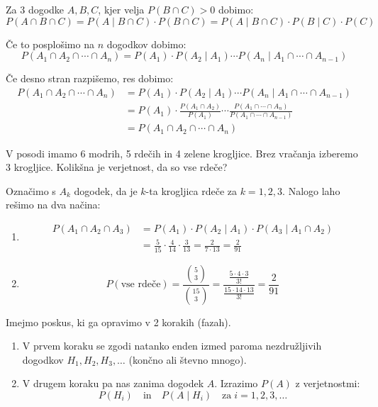 \documentclass[12pt]{book}
\def\n{\noindent}
\theoremstyle{definition}
\theoremstyle{plain}
\theoremstyle{plain}
\theoremstyle{plain}
\theoremstyle{remark}
\begin{document}
\n Za 3 dogodke $A, B, C$, kjer velja $P(B \cap C)>0$ dobimo:
$$
P(A \cap B \cap C)=P(A \mid B \cap C) \cdot P(B \cap C)=P(A \mid B \cap C) \cdot P(B \mid C) \cdot P(C)
$$

\n Če to posplošimo na $n$ dogodkov dobimo: 
$$
P\left(A_1 \cap A_2 \cap \cdots \cap A_n\right) =P\left(A_1\right) \cdot P\left(A_2 \mid A_1\right) \cdots P\left(A_n \mid A_1 \cap \cdots \cap A_{n-1}\right) 
$$

Če desno stran razpišemo, res dobimo: 
$$
\begin{aligned}
    P\left(A_1 \cap A_2 \cap \cdots \cap A_n\right) &=P\left(A_1\right) \cdot P\left(A_2 \mid A_1\right) \cdots P\left(A_n \mid A_1 \cap \cdots \cap A_{n-1}\right) \\
    &=P\left(A_1\right) \cdot \frac{P\left(A_1 \cap A_2\right)}{P\left(A_1\right)} \cdots \frac{P\left(A_1 \cap \cdots \cap A_n\right)}{P\left(A_1 \cap \cdots \cap A_{n-1}\right)} \\
    &=P\left(A_1 \cap A_2 \cap \cdots \cap A_n\right)
\end{aligned}
$$

\begin{zgled}
    V posodi imamo 6 modrih, 5 rdečih in 4 zelene krogljice. Brez vračanja izberemo 3 krogljice. Kolikšna je verjetnost, da so vse rdeče?

    Označimo s $A_k$ dogodek, da je $k$-ta krogljica rdeče za $k=1, 2, 3$. Nalogo laho rešimo na dva načina:

    \begin{enumerate}
        \item 
        $$
        \begin{aligned}
            P\left(A_1 \cap A_2 \cap A_3\right) &=P\left(A_1\right) \cdot P\left(A_2 \mid A_1\right) \cdot P\left(A_3 \mid A_1 \cap A_2\right) \\
            &=\frac{5}{15} \cdot \frac{4}{14} \cdot \frac{3}{13}=\frac{2}{7 \cdot 13}=\frac{2}{91}
        \end{aligned}
        $$
        \item $$ P(\text{vse rdeče}) = \frac{\binom{5}{3}}{\binom{15}{3}}=\frac{\frac{5 \cdot 4 \cdot 3}{3 !}}{\frac{15 \cdot 14 \cdot 13}{3 !}}=\frac{2}{91} $$
    \end{enumerate}
\end{zgled}

\n Imejmo poskus, ki ga opravimo v 2 korakih (fazah). 

\begin{enumerate}
    \item V prvem koraku se zgodi natanko enden izmed paroma nezdružljivih dogodkov $H_1, H_2, H_3, \ldots $ (končno ali števno mnogo). 
    \item V drugem koraku pa nas zanima dogodek $A$. Izrazimo $P(A)$ z verjetnostmi: $$P\left(H_i\right) \quad \text{in} \quad P\left(A \mid H_i\right) \quad \text{za} \; i= 1, 2, 3, \ldots $$
\end{enumerate}
\end{document}
